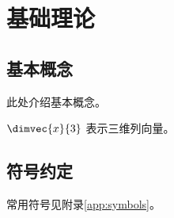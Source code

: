 \chapter{基础理论}
\label{chap:theory}

\section{基本概念}
此处介绍基本概念。
\begin{definition}[向量]
\(\dimvec{x}{3}\) 表示三维列向量。
\end{definition}

\section{符号约定}
常用符号见附录\ref{app:symbols}。
